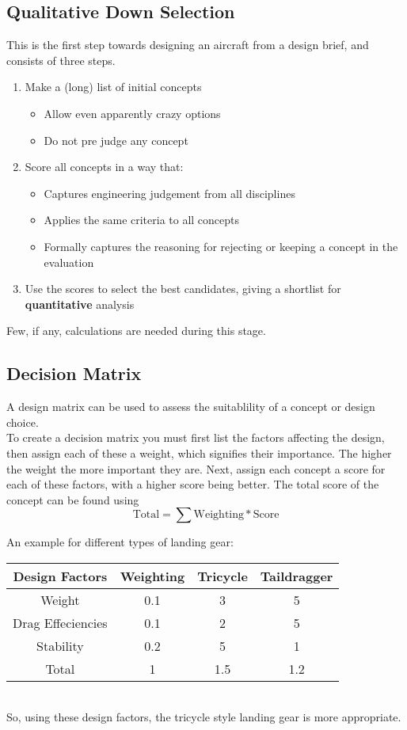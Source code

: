 \documentclass[12pt,a4paper]{article}
\begin{document}
	\subsection{Qualitative Down Selection}
		This is the first step towards designing an aircraft from a design brief, and consists of three steps.
		\begin{enumerate}
			\item Make a (long) list of initial concepts
			\begin{itemize}
				\item Allow even apparently crazy options
				\item Do not pre judge any concept
			\end{itemize}
			\item Score all concepts in a way that:
			\begin{itemize}
				\item Captures engineering judgement from all disciplines
				\item Applies the same criteria to all concepts
				\item Formally captures the reasoning for rejecting or keeping a concept in the evaluation
			\end{itemize}					
			\item Use the scores to select the best candidates, giving a shortlist for \textbf{quantitative} analysis
		\end{enumerate}
		
		Few, if any, calculations are needed during this stage.
		
	\subsection{Decision Matrix}
		A design matrix can be used to assess the suitablility of a concept or design choice. \\
		To create a decision matrix you must first list the factors affecting the design, then assign each of these a weight, which signifies their importance. The higher the weight the more important they are. Next, assign each concept a score for each of these factors, with a higher score being better. The total score of the concept can be found using
		\[ \text{Total} = \sum \text{Weighting}*\text{Score} \]
		
		An example for different types of landing gear: \\
		
		\begin{tabularx}{\textwidth}{c | c c c}
			Design Factors & Weighting & Tricycle & Taildragger \\
			\hline
			Weight & 0.1 & 3 & 5 \\
			Drag Effeciencies & 0.1 & 2 & 5 \\
			Stability & 0.2 & 5 & 1 \\
			Total & 1 & 1.5 & 1.2 \\
		\end{tabularx}
		\linebreak
		\\
		So, using these design factors, the tricycle style landing gear is more appropriate.
\end{document}
